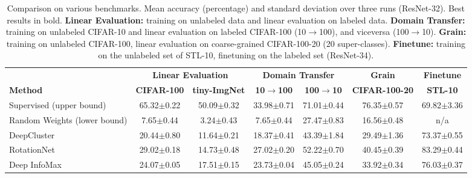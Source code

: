 \documentclass{article}
\begin{document}
\begin{table}[t!]
 \caption{Comparison on various benchmarks. Mean accuracy (percentage) and standard deviation over three runs (ResNet-32). Best results in bold. \textbf{Linear Evaluation:} training on unlabeled data and linear evaluation on labeled data. \textbf{Domain Transfer:} training on unlabeled CIFAR-10 and linear evaluation on labeled CIFAR-100 (10$\rightarrow$100), and viceversa (100$\rightarrow$10). \textbf{Grain:} training on unlabeled CIFAR-100, linear evaluation on coarse-grained CIFAR-100-20 (20 super-classes). \textbf{Finetune:} training on the unlabeled set of STL-10, finetuning on the labeled set (ResNet-34).}
 \label{tab:results}
 \begin{adjustbox}{width=\columnwidth,center}
  \centering
  \begin{tabular}{lcccccc}
    \toprule
     & \multicolumn{2}{c}{\textbf{Linear Evaluation}} & \multicolumn{2}{c}{\textbf{Domain Transfer}} &
     \multicolumn{1}{c}{\textbf{Grain}} &
     \multicolumn{1}{c}{\textbf{Finetune}}\\
    \cmidrule[0.1pt](r){2-3} \cmidrule[0.1pt](r){4-5} \cmidrule[0.1pt](l){6-6} \cmidrule[0.1pt](l){7-7}
    \textbf{Method} &
    \textbf{\small{CIFAR-100}} & \textbf{\small{tiny-ImgNet}} &
    \textbf{\small{10$\rightarrow$100}} & \textbf{\small{100$\rightarrow$10}} &
    \textbf{\small{CIFAR-100-20}} & \textbf{\small{STL-10}} \\
    \midrule
    Supervised (upper bound) & 
    65.32$\pm$\small{0.22} & 50.09$\pm$\small{0.32}  & 33.98$\pm$\small{0.71} & 71.01$\pm$\small{0.44} & 76.35$\pm$\small{0.57} & 69.82$\pm$\small{3.36} \\
    Random Weights (lower bound) & 
    7.65$\pm$\small{0.44} & 3.24$\pm$\small{0.43} & 7.65$\pm$\small{0.44} & 27.47$\pm$\small{0.83} & 16.56$\pm$\small{0.48} & n/a \\
    \cmidrule(l){1-7}
    DeepCluster \citep{caron2018deep} & 
    20.44$\pm$\small{0.80} & 11.64$\pm$\small{0.21} & 18.37$\pm$\small{0.41} & 43.39$\pm$\small{1.84} & 29.49$\pm$\small{1.36} & 73.37$\pm$\small{0.55} \\
    RotationNet \citep{gidaris2018unsupervised} & 
    29.02$\pm$\small{0.18} & 14.73$\pm$\small{0.48} & 27.02$\pm$\small{0.20} & 52.22$\pm$\small{0.70} & 40.45$\pm$\small{0.39} & 83.29$\pm$\small{0.44} \\
    Deep InfoMax \citep{hjelm2018learning} & 
    24.07$\pm$\small{0.05} & 17.51$\pm$\small{0.15} & 23.73$\pm$\small{0.04} & 45.05$\pm$\small{0.24} & 33.92$\pm$\small{0.34} & 76.03$\pm$\small{0.37} \\

\end{tabular}
\end{adjustbox}
\end{table}
\end{document}
